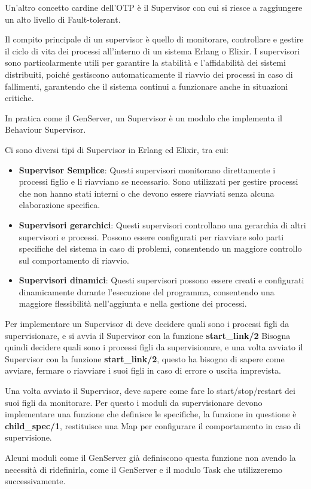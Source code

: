 Un'altro concetto cardine dell'OTP è il Supervisor con cui si
riesce a raggiungere un alto livello di Fault-tolerant.

Il compito principale di un supervisor è quello di monitorare,
controllare e gestire il ciclo di vita dei processi all'interno
di un sistema Erlang o Elixir. I supervisori sono 
particolarmente utili per garantire la stabilità e 
l'affidabilità dei sistemi distribuiti, poiché gestiscono 
automaticamente il riavvio dei processi in caso di fallimenti, 
garantendo che il sistema continui a funzionare anche in
situazioni critiche.

In pratica come il GenServer, un  Supervisor è un modulo
che implementa il Behaviour Supervisor.

\newpage

Ci sono diversi tipi di Supervisor in Erlang ed Elixir, tra cui:
\begin{itemize}
  \item \textbf{Supervisor Semplice}: Questi supervisori monitorano
  direttamente i processi figlio e li riavviano se necessario.
  Sono utilizzati per gestire processi che non hanno stati interni
  o che devono essere riavviati senza alcuna elaborazione specifica.
  \item \textbf{Supervisori gerarchici}: Questi supervisori controllano
  una gerarchia di altri supervisori e processi.
  Possono essere configurati per riavviare solo parti
  specifiche del sistema in caso di problemi,
  consentendo un maggiore controllo sul comportamento di riavvio.
  \item \textbf{Supervisori dinamici}: Questi supervisori possono
  essere creati e configurati dinamicamente durante l'esecuzione
  del programma, consentendo una maggiore flessibilità
  nell'aggiunta e nella gestione dei processi.


 
\end{itemize}

Per implementare un Supervisor di deve decidere quali sono i processi
figli da supervisionare, e si avvia il Supervisor
con la funzione \textbf{start\_link/2}
Bisogna quindi decidere quali sono i processi figli da supervisionare,
e una volta avviato il Supervisor con la funzione \textbf{start\_link/2},
questo ha bisogno di sapere come avviare, fermare o riavviare i suoi figli
in caso di errore o uscita imprevista.

Una volta avviato il Supervisor, deve sapere come fare lo start/stop/restart
dei suoi figli da monitorare. Per questo i moduli da supervisionare
devono implementare una funzione che definisce le specifiche,
la funzione in questione è \textbf{child\_spec/1},
restituisce una Map per
configurare il comportamento in caso di supervisione.

Alcuni moduli come il GenServer già definiscono questa funzione
non avendo la necessità di ridefinirla, come il GenServer e
il modulo Task che utilizzeremo successivamente.
